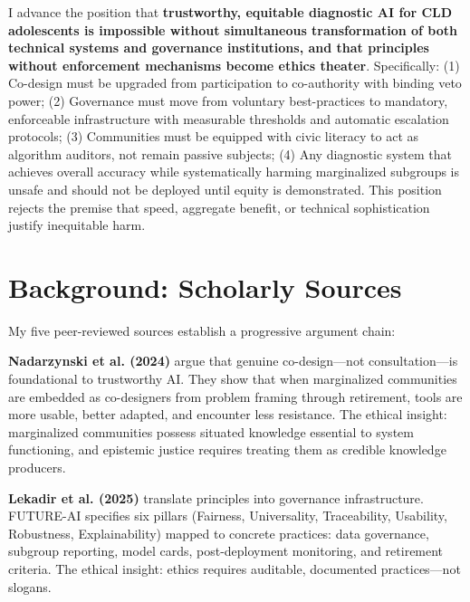 \documentclass[12pt,a4paper]{article}
\begin{document}
I advance the position that \textbf{trustworthy, equitable diagnostic AI for CLD adolescents is impossible without simultaneous transformation of both technical systems and governance institutions, and that principles without enforcement mechanisms become ethics theater}. Specifically: (1) Co-design must be upgraded from participation to co-authority with binding veto power; (2) Governance must move from voluntary best-practices to mandatory, enforceable infrastructure with measurable thresholds and automatic escalation protocols; (3) Communities must be equipped with civic literacy to act as algorithm auditors, not remain passive subjects; (4) Any diagnostic system that achieves overall accuracy while systematically harming marginalized subgroups is unsafe and should not be deployed until equity is demonstrated. This position rejects the premise that speed, aggregate benefit, or technical sophistication justify inequitable harm.

\section{Background: Scholarly Sources}

My five peer-reviewed sources establish a progressive argument chain:

\textbf{Nadarzynski et al. (2024)} argue that genuine co-design—not consultation—is foundational to trustworthy AI. They show that when marginalized communities are embedded as co-designers from problem framing through retirement, tools are more usable, better adapted, and encounter less resistance. The ethical insight: marginalized communities possess situated knowledge essential to system functioning, and epistemic justice requires treating them as credible knowledge producers.\cite{nadarzynski2024}

\textbf{Lekadir et al. (2025)} translate principles into governance infrastructure. FUTURE-AI specifies six pillars (Fairness, Universality, Traceability, Usability, Robustness, Explainability) mapped to concrete practices: data governance, subgroup reporting, model cards, post-deployment monitoring, and retirement criteria. The ethical insight: ethics requires auditable, documented practices—not slogans.\cite{lekadir2025}
\end{document}
